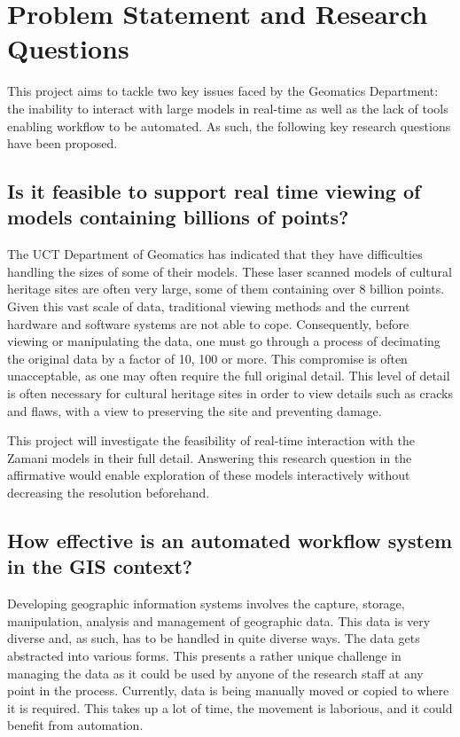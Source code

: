 \documentclass[12pt,a4paper]{article}
\begin{document}
\section{Problem Statement and Research Questions}
This project aims to tackle two key issues faced by the Geomatics Department: the inability to interact with large models in real-time as well as the lack of tools enabling workflow to be automated. As such, the following key research questions have been proposed.
\subsection{Is it feasible to support real time viewing of models containing billions of points?}
The UCT Department of Geomatics has indicated that they have difficulties
handling the sizes of some of their models. These laser scanned models of
cultural heritage sites are often very large, some of them containing over
8 billion points. Given this vast scale of data, traditional viewing methods
and the current hardware and software systems are not able to cope.
Consequently, before viewing or manipulating the data, one must go through
a process of decimating the original data by a factor of 10, 100 or more.
This compromise is often unacceptable, as one may often require the full
original detail. This level of detail is often necessary for cultural heritage
sites in order to view details such as cracks and flaws, with a view to
preserving the site and preventing damage.

This project will investigate the feasibility of real-time interaction with the Zamani models in their full detail. Answering this research question in the affirmative would enable exploration of these models interactively without decreasing the resolution beforehand.
\subsection{How effective is an automated workflow system in the GIS context?}
Developing geographic information systems involves the capture, storage, manipulation, analysis
and management of geographic data. This data is very diverse and, as such, has to be handled
in quite diverse ways. The data gets abstracted into various forms. This presents a
rather unique challenge in managing the data as it could be used by anyone of the research
staff at any point in the process. Currently, data is being manually moved or copied to
where it is required. This takes up a lot of time, the movement is laborious, and it could benefit from automation.
\end{document}
